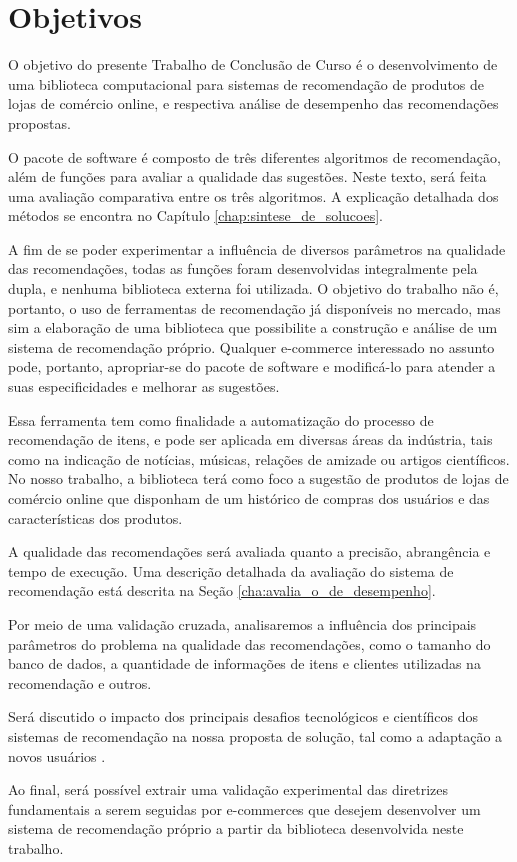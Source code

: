 \section[Objetivos]{Objetivos}
\label{chap:objetivos}

O objetivo do presente Trabalho de Conclusão de Curso é o desenvolvimento de uma biblioteca computacional para sistemas de recomendação de produtos de lojas de comércio online, e respectiva análise de desempenho das recomendações propostas. 

O pacote de software é composto de três diferentes algoritmos de recomendação, além de funções para avaliar a qualidade das sugestões. Neste texto, será feita uma avaliação comparativa entre os três algoritmos. A explicação detalhada dos métodos se encontra no Capítulo \ref{chap:sintese_de_solucoes}.  

A fim de se poder experimentar a influência de diversos parâmetros na qualidade das recomendações, todas as funções foram desenvolvidas integralmente pela dupla, e nenhuma biblioteca externa foi utilizada. O objetivo do trabalho não é, portanto, o uso de ferramentas de recomendação já disponíveis no mercado, mas sim a elaboração de uma biblioteca que possibilite a construção e análise de um sistema de recomendação  próprio. Qualquer e-commerce interessado no assunto pode, portanto, apropriar-se do pacote de software e modificá-lo para atender a suas especificidades e melhorar as sugestões.

Essa ferramenta tem como finalidade a automatização do processo de recomendação de itens, e pode ser aplicada em diversas áreas da indústria, tais como na indicação de notícias, músicas, relações de amizade ou artigos científicos. No nosso trabalho, a biblioteca terá como foco a sugestão de produtos de lojas de comércio online que disponham de um histórico de compras dos usuários e das características dos produtos.

A qualidade das recomendações será avaliada quanto a precisão, abrangência e tempo de execução. Uma descrição detalhada da avaliação do sistema de recomendação está descrita na Seção \ref{cha:avalia_o_de_desempenho}.

Por meio de uma validação cruzada, analisaremos a influência dos principais parâmetros do problema na qualidade das recomendações, como o tamanho do banco de dados, a quantidade de informações de itens e clientes utilizadas na recomendação e outros.

Será discutido o impacto dos principais desafios tecnológicos e científicos dos sistemas de recomendação na nossa proposta de solução, tal como a adaptação a novos usuários \cite{sarwar2000analysis}.

Ao final, será possível extrair uma validação experimental das diretrizes fundamentais a serem seguidas por e-commerces que desejem desenvolver um sistema de recomendação próprio a partir da biblioteca desenvolvida neste trabalho. 